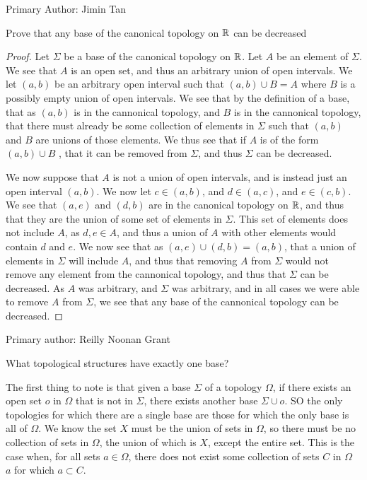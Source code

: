Primary Author: Jimin Tan

\begin{minorEx}[Riddle]%
  Prove that any base of the canonical topology on $\mathbb{R}$ can be decreased
\end{minorEx}
\begin{proof}
  Let $\Sigma$ be a base of the canonical topology on $\mathbb{R}$. Let $A$ be an element of 
  $\Sigma$. We see that $A$ is an open set, and thus an arbitrary
  union of open intervals. We let $(a,b)$  be an arbitrary open
  interval such that $(a,b)\cup B =A$ where $B$ is a possibly empty
  union of open intervals. We see that by the definition of a base,
  that as $(a,b)$ is in the cannonical topology, and $B$ is in the
  cannonical topology, that there must already be some collection of
  elements in $\Sigma$ such that $(a,b)$ and $B$ are unions of those
  elements. We thus see that if $A$ is of the form $(a,b)\cup B$ , that
  it can be removed from $\Sigma$, and thus $\Sigma$ 
  can be decreased. 

  We now suppose that $A$ is not a union of open intervals, and is instead
  just an open interval $(a,b)$. We now let $c\in (a,b)$, and
  $d\in (a,c)$, and $e\in (c,b)$. We see that $(a,e)$ and $(d,b)$ are
  in the canonical topology on $\mathbb{R}$, and thus that they are the union
  of some set of elements in $\Sigma$. This set of elements does not
  include $A$, as $d,e\in A$, and thus a union of $A$ with other
  elements would contain $d$ and $e$. We now see that as 
  $(a,e)\cup (d,b) = (a,b)$, that a union of elements in $\Sigma$ will
  include $A$, and thus that removing $A$ from $\Sigma$ would not
  remove any element from the cannonical topology, and thus that
  $\Sigma$ can be decreased. As $A$ was arbitrary, and $\Sigma$ was
  arbitrary, and in all cases we were able to remove $A$ from
  $\Sigma$, we see that any base of the cannonical topology 
  can be decreased.
\end{proof}

Primary author: Reilly Noonan Grant

\begin{minorEx}[Riddle]%
What topological structures have exactly one base?
\end{minorEx}
The first thing to note is that given a base $\Sigma$ of a topology $\Omega$, if there exists an open set $o$ in $\Omega$ that is not in $\Sigma$, there exists another base $\Sigma \cup o$. SO the only topologies for which there are a single base are those for which the only base is all of $\Omega$. We know the set $X$ must be the union of sets in $\Omega$, so there must be no collection of sets in $\Omega$, the union of which is $X$, except the entire set. This is the case when, for all sets $a \in \Omega$, there does not exist some collection of sets $C$ in $\Omega$ \ $a$ for which $a \subset C$.
